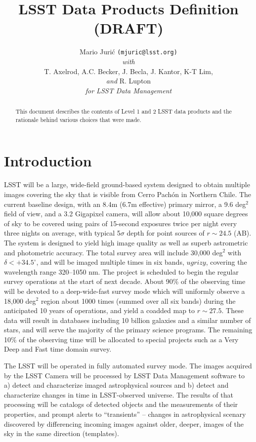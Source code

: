 \documentclass[12pt]{article}
\title{LSST Data Products Definition (DRAFT)}
\author{
    Mario Juri\'c \texttt{(mjuric@lsst.org)} \vspace{1ex} \\
    {\em with} \vspace{1ex} \\
    T. Axelrod, A.C. Becker, J. Becla,  J. Kantor, K-T Lim,\\
    {\em and} R. Lupton \vspace{1.2ex} \\
    {\em for LSST Data Management}
}
\newcommand{\B}[1]{{#1}}
\newcommand{\R}[1]{{\color{red}}}
\begin{document}
\maketitle

\begin{abstract}
This document describes the contents of Level 1 and 2 LSST data products and the rationale behind various choices that were made.
\end{abstract}

\tableofcontents

\section{Introduction}

LSST will be a large, wide-field ground-based system
designed to obtain multiple images covering the sky that is visible from Cerro Pach\'{o}n in Northern Chile. The current baseline design, with an 8.4m (6.7m effective) primary mirror, a 9.6 deg$^2$ field of view, and a 3.2 Gigapixel camera, will allow about 10,000 square degrees of sky to be covered using pairs  of 15-second exposures \R{in two photometric bands} \B{twice per night} every three nights on average, with typical 5$\sigma$ depth for point sources of $r\sim24.5$ (AB). The system is designed to yield high image quality as well as superb astrometric  and photometric accuracy. The \B{total} survey area will include 30,000 deg$^2$ with $\delta<+34.5^\circ$, and will be imaged multiple times in six bands, $ugrizy$, covering the wavelength range 320--1050 nm. The project is scheduled to  begin the regular survey operations at the start of next decade. About 90\% of the observing time will be devoted to a deep-wide-fast survey mode which will \B{uniformly} observe a 18,000 deg$^2$ region about 1000 times (summed over all six bands) during the anticipated 10 years of operations, and yield a coadded map to $r\sim27.5$. These data will result in databases including 10 billion galaxies and a similar number of stars, and will serve the majority of the primary science programs. The remaining 10\% of the observing time will be allocated to special projects such as a Very Deep and Fast time domain survey.

The LSST will be operated in fully automated survey mode. The images acquired by the LSST Camera will be processed by LSST Data Management software to a) detect and characterize imaged astrophysical sources and b) detect and characterize changes in time in LSST-observed universe. The results of that processing will be catalogs of detected objects and the measurements of their properties, and prompt alerts to ``transients'' -- changes in astrophysical scenary discovered by differencing incoming images against older, deeper, images of the sky in the same direction (templates).
\end{document}
